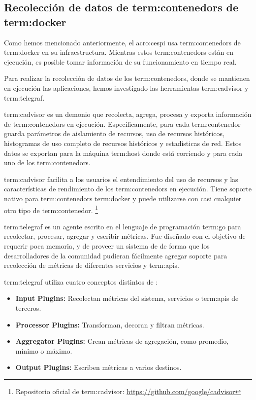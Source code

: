 \subsection{Recolección de datos de \glspl{term:contenedor} de \gls{term:docker}}
\label{contenedores}

Como hemos mencionado anteriormente, el \gls{acro:cespi} usa \glspl{term:contenedor}
de \gls{term:docker} en su infraestructura. Mientras estos
\glspl{term:contenedor} están en ejecución, es posible tomar información de su
funcionamiento en tiempo real.

Para realizar la recolección de datos de los \glspl{term:contenedor}, donde se
mantienen en ejecución las aplicaciones, hemos investigado las herramientas
\gls{term:cadvisor} y \gls{term:telegraf}.

\gls{term:cadvisor} es un demonio que recolecta, agrega,
procesa y exporta información de \glspl{term:contenedor} en ejecución.
Específicamente, para cada \gls{term:contenedor} guarda parámetros de
aislamiento de recursos, uso de recursos históricos, histogramas de uso
completo de recursos históricos y estadísticas de red. Estos datos se exportan
para la máquina \gls{term:host} donde está corriendo y para cada uno de los
\glspl{term:contenedor}.

\gls{term:cadvisor} facilita a los usuarios el entendimiento del uso de
recursos y las características de rendimiento de los \glspl{term:contenedor} en
ejecución.  Tiene soporte nativo para \glspl{term:contenedor} \gls{term:docker}
y puede utilizarse con casi cualquier otro tipo de \gls{term:contenedor}.
\footnote{Repositorio oficial de \gls{term:cadvisor}: \url{https://github.com/google/cadvisor}}

\gls{term:telegraf} es un agente escrito en el lenguaje de programación \gls{term:go} para
recolectar, procesar, agregar y escribir métricas. Fue diseñado con el objetivo
de requerir poca memoria, y de proveer un sistema de  de forma que
los desarrolladores de la comunidad pudieran fácilmente agregar soporte para
recolección de métricas de diferentes servicios y \glspl{term:api}.

\gls{term:telegraf} utiliza cuatro conceptos distintos de :

\begin{itemize}

  \item \textbf{Input Plugins:}
  Recolectan métricas del sistema, servicios o \glspl{term:api} de terceros.

  \item \textbf{Processor Plugins:}
  Transforman, decoran y filtran métricas.

  \item \textbf{Aggregator Plugins:}
  Crean métricas de agregación, como promedio, mínimo o máximo.

  \item \textbf{Output Plugins:}
  Escriben métricas a varios destinos.

\end{itemize}

